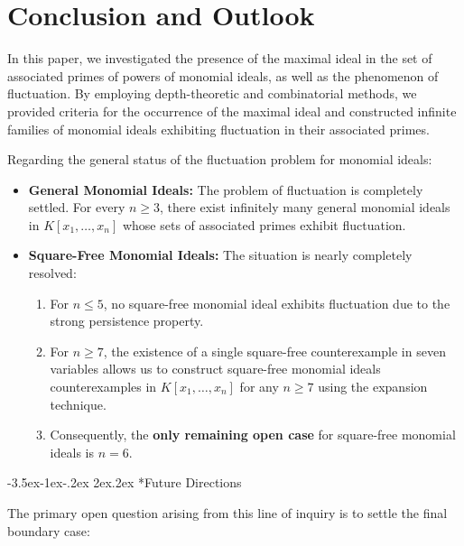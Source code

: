 \documentclass[11pt]{amsart}
\makeatletter
\def\subsection{\@startsection{subsection}{2}{\z@}%
  {-3.5ex\@plus -1ex\@minus -.2ex}%
  {2ex\@plus .2ex}%
  {\normalfont\bfseries}}
\makeatother
\begin{document}



 \section{Conclusion and Outlook}

In this paper, we investigated the presence of the maximal ideal in the set of associated primes of powers of monomial ideals, as well as the phenomenon of fluctuation. By employing depth-theoretic and combinatorial methods, we provided criteria for the occurrence of the maximal ideal and constructed infinite families of monomial ideals exhibiting fluctuation in their associated primes.

Regarding the general status of the fluctuation problem for monomial ideals:
\begin{itemize}
    \item \textbf{General Monomial Ideals:} The problem of fluctuation is completely settled. For every $n \ge 3$, there exist infinitely many general monomial ideals in $K[x_1, \dots, x_n]$ whose sets of associated primes exhibit fluctuation.
    \item \textbf{Square-Free Monomial Ideals:} The situation is nearly completely resolved:
    \begin{enumerate}
        \item For $n \le 5$, no square-free monomial ideal exhibits fluctuation due to the strong persistence property.
        \item For $n \ge 7$, the existence of a single square-free counterexample in seven variables allows us to construct  square-free monomial ideals
        counterexamples in $K[x_1, \dots, x_n]$ for any $n \ge 7$ using the expansion  technique.
        \item Consequently, the \textbf{only remaining open case} for square-free monomial ideals is $n = 6$.
    \end{enumerate}
\end{itemize}

\subsection*{Future Directions}

The primary open question arising from this line of inquiry is to settle the final boundary case:
\end{document}
